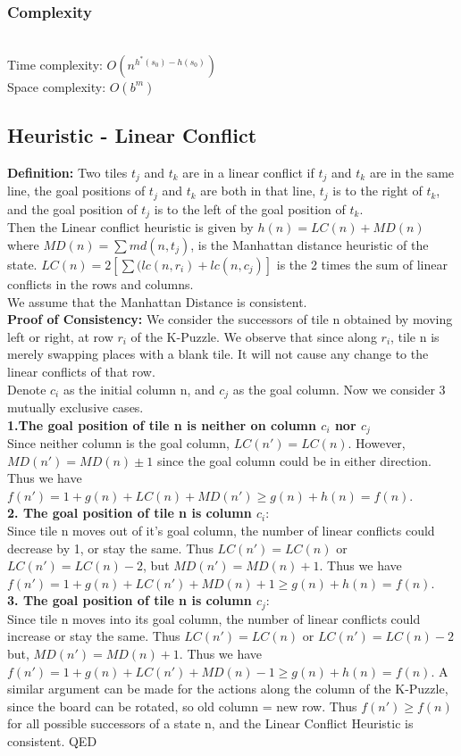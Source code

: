 \documentclass{llncs}
\begin{document}
\subsubsection{Complexity}\hfill\\
Time complexity: $O(n^{h^*(s_0)-h(s_0)})$\\
Space complexity: $O(b^m)$

\subsection{Heuristic - Linear Conflict}

\textbf{Definition:}
Two tiles $t_j$ and $t_k$ are in a linear conflict 
if $t_j$ and $t_k$ are in the same line, the goal positions of $t_j$ and $t_k$ 
are both in that line, $t_j$ is to the right of $t_k$, and the goal position of $t_j$
is to the left of the goal position of $t_k$. \\
Then the Linear conflict heuristic is given by $h(n) = LC(n) + MD(n)$ where $MD(n)=\sum md(n,t_j)$, is the Manhattan distance heuristic of the state. $LC(n) = 2[\sum(lc(n,r_i) +lc(n,c_j)]$ is the 2 times the sum of linear conflicts in the rows and columns. \\
We assume that the Manhattan Distance is consistent.\\
\textbf{Proof of Consistency:}
We consider the successors of tile n obtained by moving left or right, at row $r_i$ of the K-Puzzle. We observe that since along $r_i$, tile n is merely swapping places with a blank tile. It will not cause any change to the linear conflicts of that row. \\
Denote $c_i$ as the initial column n, and $c_j$ as the goal column. Now we consider 3 mutually exclusive cases. \\
\textbf{1.The goal position of tile n is neither on column $c_i$ nor $c_j$} \\
Since neither column is the goal column, $LC(n') = LC(n)$.
However, $MD(n') = MD(n) \pm 1$ since the goal column could be in either direction. Thus we have $f(n') = 1 + g(n) + LC(n) + MD(n') \geq  g(n) + h(n) = f(n)$. \\
\textbf{2. The goal position of tile n is column $c_i$}: \\
Since tile n moves out of it's goal column, the number of linear conflicts could decrease by 1, or stay the same.
Thus $LC(n') = LC(n)$ or $LC(n') = LC(n) - 2$, but $MD(n') = MD(n) + 1$. Thus we have $f(n') =1 + g(n) + LC(n') + MD(n) + 1 \geq g(n) + h(n) = f(n)$. \\
\textbf{3. The goal position of tile n is column $c_j$}: \\
Since tile n moves into its goal column, the number of linear conflicts could increase or stay the same.
Thus $LC(n') = LC(n)$ or $LC(n') = LC(n) - 2$ but, $MD(n') = MD(n) + 1$. Thus we have $f(n') = 1 + g(n) + LC(n') + MD(n) - 1 \geq g(n) + h(n) = f(n)$.
A similar argument can be made for the actions along the column of the K-Puzzle, since the board can be rotated, so old column = new row.
Thus $f(n') \geq f(n)$ for all possible successors of a state n, and the Linear Conflict Heuristic is consistent. QED
\end{document}
